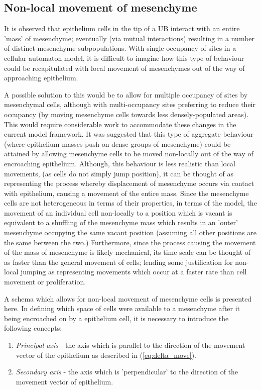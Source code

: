 \documentclass[pdftex,10pt,a4paper]{article}
\begin{document}
\subsection{Non-local movement of mesenchyme}\label{sec:nonlocal}
It is observed that epithelium cells in the tip of a UB interact with an entire 'mass' of mesenchyme; eventually (via mutual interactions) resulting in a number of distinct mesenchyme subpopulations. With single occupancy of sites in a cellular automaton model, it is difficult to imagine how this type of behaviour could be recapitulated with local movement of mesenchymes out of the way of approaching epithelium. 

A possible solution to this would be to allow for multiple occupancy of sites by mesenchymal cells, although with multi-occupancy sites preferring to reduce their occupancy (by moving mesenchyme cells towards less densely-populated areas). This would require considerable work to accommodate these changes in the current model framework. It was suggested that this type of aggregate behaviour (where epithelium masses push on dense groups of mesenchyme) could be attained by allowing mesenchyme cells to be moved non-locally out of the way of encroaching epithelium. Although, this behaviour is less realistic than local movements, (as cells do not simply jump position), it can be thought of as representing the process whereby displacement of mesenchyme occurs via contact with epithelium, causing a movement of the entire mass. Since the mesenchyme cells are not heterogeneous in terms of their properties, in terms of the model, the movement of an individual cell non-locally to a position which is vacant is equivalent to a shuffling of the mesenchyme mass which results in an 'outer' mesenchyme occupying the same vacant position (assuming all other positions are the same between the two.) Furthermore, since the process causing the movement of the mass of mesenchyme is likely mechanical, its time scale can be thought of as faster than the general movement of cells; lending some justification for non-local jumping as representing movements which occur at a faster rate than cell movement or proliferation.

A schema which allows for non-local movement of mesenchyme cells is presented here. In defining which space of cells were available to a mesenchyme after it being encroached on by a epithelium cell, it is necessary to introduce the following concepts:

\begin{enumerate}
\item \textit{Principal axis} - the axis which is parallel to the direction of the movement vector of the epithelium as described in (\ref{eq:delta_move}).
\item \textit{Secondary axis} - the axis which is 'perpendicular' to the direction of the movement vector of epithelium.
\end{enumerate}
\end{document}
